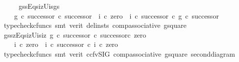 \begin{isabellebody}
\ \ \isamarkupfalse%
\ \isamarkupfalse%
\ g{\isacharunderscore}{\kern0pt}s{\isacharunderscore}{\kern0pt}s{\isacharunderscore}{\kern0pt}Eqs{\isacharunderscore}{\kern0pt}i{}zUi{}s{\isacharunderscore}{\kern0pt}g{\isacharunderscore}{\kern0pt}s{\isacharcolon}{\kern0pt}\isanewline
\ \ \ \ {\isachardoublequoteopen}{\isacharparenleft}{\kern0pt}g\ {\isasymcirc}\isactrlsub c\ successor{\isacharparenright}{\kern0pt}\ {\isasymcirc}\isactrlsub c\ successor\ {\isacharequal}{\kern0pt}\ {\isacharparenleft}{\kern0pt}{\isacharparenleft}{\kern0pt}i{}\ {\isasymcirc}\isactrlsub c\ zero{\isacharparenright}{\kern0pt}\ {\isasymamalg}\ {\isacharparenleft}{\kern0pt}i{}\ {\isasymcirc}\isactrlsub c\ successor{\isacharparenright}{\kern0pt}{\isacharparenright}{\kern0pt}\ {\isasymcirc}\isactrlsub c\ {\isacharparenleft}{\kern0pt}g\ {\isasymcirc}\isactrlsub c\ successor{\isacharparenright}{\kern0pt}{\isachardoublequoteclose}\isanewline
\ \ \ \ \isamarkupfalse%
\ {\isacharparenleft}{\kern0pt}typecheck{\isacharunderscore}{\kern0pt}cfuncs{\isacharcomma}{\kern0pt}\ smt\ {\isacharparenleft}{\kern0pt}verit{\isacharcomma}{\kern0pt}\ del{\isacharunderscore}{\kern0pt}insts{\isacharparenright}{\kern0pt}\ comp{\isacharunderscore}{\kern0pt}associative{}\ g{\isacharunderscore}{\kern0pt}square{\isacharparenright}{\kern0pt}\isanewline
\ \ \isamarkupfalse%
\ \isamarkupfalse%
\ g{\isacharunderscore}{\kern0pt}s{\isacharunderscore}{\kern0pt}s{\isacharunderscore}{\kern0pt}zEqs{\isacharunderscore}{\kern0pt}i{}zUi{}s{\isacharunderscore}{\kern0pt}i{}z{\isacharcolon}{\kern0pt}\ {\isachardoublequoteopen}{\isacharparenleft}{\kern0pt}{\isacharparenleft}{\kern0pt}g\ {\isasymcirc}\isactrlsub c\ successor{\isacharparenright}{\kern0pt}\ {\isasymcirc}\isactrlsub c\ successor{\isacharparenright}{\kern0pt}{\isasymcirc}\isactrlsub c\ zero\ {\isacharequal}{\kern0pt}\isanewline
\ \ \ \ {\isacharparenleft}{\kern0pt}{\isacharparenleft}{\kern0pt}i{}\ {\isasymcirc}\isactrlsub c\ zero{\isacharparenright}{\kern0pt}\ {\isasymamalg}\ {\isacharparenleft}{\kern0pt}i{}\ {\isasymcirc}\isactrlsub c\ successor{\isacharparenright}{\kern0pt}{\isacharparenright}{\kern0pt}\ {\isasymcirc}\isactrlsub c\ {\isacharparenleft}{\kern0pt}i{}\ {\isasymcirc}\isactrlsub c\ zero{\isacharparenright}{\kern0pt}{\isachardoublequoteclose}\isanewline
\ \ \ \ \isamarkupfalse%
\ {\isacharparenleft}{\kern0pt}typecheck{\isacharunderscore}{\kern0pt}cfuncs{\isacharcomma}{\kern0pt}\ smt\ {\isacharparenleft}{\kern0pt}verit{\isacharcomma}{\kern0pt}\ ccfv{\isacharunderscore}{\kern0pt}SIG{\isacharparenright}{\kern0pt}\ comp{\isacharunderscore}{\kern0pt}associative{}\ g{\isacharunderscore}{\kern0pt}square\ second{\isacharunderscore}{\kern0pt}diagram{}{\isacharparenright}{\kern0pt}\isanewline

\end{isabellebody}
